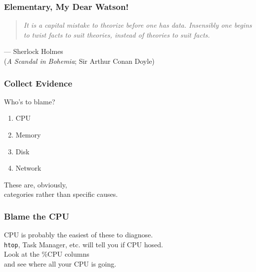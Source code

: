 \begin{frame}
\frametitle{Elementary, My Dear Watson!}

\Large
\begin{changemargin}{1cm}
\begin{quote}
\textit{It is a capital mistake to theorize before one has data. Insensibly one begins to twist facts to suit theories, instead of theories to suit facts.}
\end{quote}
\hfill --- Sherlock Holmes\\
\hfill (\textit{A Scandal in Bohemia}; Sir Arthur Conan Doyle)
\end{changemargin}
\end{frame}



\begin{frame}
\frametitle{Collect Evidence}

\Large
\begin{changemargin}{1cm}
Who's to blame?
\begin{enumerate}
	\item CPU
	\item Memory
	\item Disk
	\item Network
\end{enumerate}

These are, obviously, \\
categories rather than specific causes.
\end{changemargin}
\end{frame}



\begin{frame}
\frametitle{Blame the CPU}

\large
\begin{changemargin}{1cm}
CPU is probably the easiest of these to diagnose. \\[1em]
\texttt{htop}, Task Manager, etc. will tell you if CPU hosed.\\
Look at the \%CPU columns\\
and see where all your CPU is going. 
\end{changemargin}


\end{frame}



